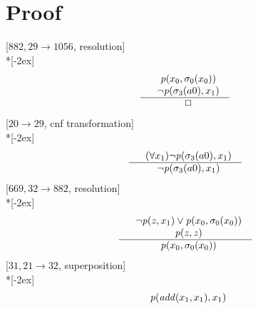 \documentclass[fleqn]{article}
\newenvironment{VampireProof}{%
   \section{Proof}}{}
\newenvironment{VampireInference}{%
   \begin{array}{c}}{\end{array}}
\newenvironment{VampirePremise}%
   {\begin{array}{l}}%
   {\end{array}}
\newenvironment{VampireConclusion}%
   {\begin{array}{l}}%
   {\end{array}}
\newcommand{\VPremiseSeparator}{\\}
\newcommand{\VConclusionSeparator}{\\ \hline}
\newcommand{\Vor}{\vee}
\newcommand{\VEmptyClause}{\Box}
\begin{document}
\begin{VampireProof}
[$882,29\rightarrow 1056$, resolution]\\*[-2ex]
\[\begin{VampireInference}
\begin{VampirePremise}%
~~\mathit{p} (x_{0},\sigma_{0}(x_{0}))
\end{VampirePremise}
\VPremiseSeparator
\begin{VampirePremise}%
~~\neg \mathit{p} (\sigma_{3}(a0),x_{1})
\end{VampirePremise}
\VConclusionSeparator
\begin{VampireConclusion}
~~\VEmptyClause
\end{VampireConclusion}
\end{VampireInference}
\]
[$20\rightarrow 29$, cnf transformation]\\*[-2ex]
\[\begin{VampireInference}
\begin{VampirePremise}%
~~(\forall x_{1} )\neg \mathit{p} (\sigma_{3}(a0),x_{1})
\end{VampirePremise}
\VConclusionSeparator
\begin{VampireConclusion}
~~\neg \mathit{p} (\sigma_{3}(a0),x_{1})
\end{VampireConclusion}
\end{VampireInference}
\]
[$669,32\rightarrow 882$, resolution]\\*[-2ex]
\[\begin{VampireInference}
\begin{VampirePremise}%
~~\neg \mathit{p} (\mathit{z},x_{1}) \Vor \mathit{p} (x_{0},\sigma_{0}(x_{0}))
\end{VampirePremise}
\VPremiseSeparator
\begin{VampirePremise}%
~~\mathit{p} (\mathit{z},\mathit{z})
\end{VampirePremise}
\VConclusionSeparator
\begin{VampireConclusion}
~~\mathit{p} (x_{0},\sigma_{0}(x_{0}))
\end{VampireConclusion}
\end{VampireInference}
\]
[$31,21\rightarrow 32$, superposition]\\*[-2ex]
\[\begin{VampireInference}
\begin{VampirePremise}%
~~\mathit{p} (\mathit{add} (x_{1},x_{1}),x_{1})
\end{VampirePremise}
\VPremiseSeparator
\begin{VampirePremise}%

\end{VampirePremise}
\end{VampireInference}\]
\end{VampireProof}
\end{document}
